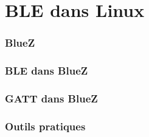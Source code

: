 \section{BLE dans Linux}

\begin{frame}
	\frametitle{BlueZ}
\end{frame}

\begin{frame}
	\frametitle{BLE dans BlueZ}
\end{frame}

\begin{frame}
	\frametitle{GATT dans BlueZ}
\end{frame}

\begin{frame}
	\frametitle{Outils pratiques}
\end{frame}

